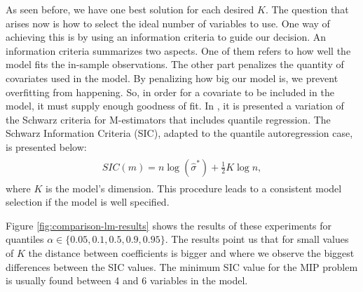 As seen before, we have one best solution for each desired $K$. The question that arises now is how to select the ideal number of variables to use.
One way of achieving this is by using an information criteria to guide our decision. 
An information criteria summarizes two aspects. One of them refers to how well the model fits the in-sample observations. The other part penalizes the quantity of covariates used in the model. By penalizing how big our model is, we prevent overfitting from happening. So, in order for a covariate to be included in the model, it must supply enough goodness of fit.
In \cite{machado1993robust}, it is presented a variation of the Schwarz criteria for M-estimators that includes quantile regression. The Schwarz Information Criteria (SIC), adapted to the quantile autoregression case, is presented below:
\begin{align} 
\begin{split}
SIC(m) = n \log(\hat{\sigma}^*)+\frac{1}{2}K\log n,\label{eq:SIC}
\end{split}					
\end{align}
where $K$ is the model's dimension. This procedure leads to a consistent model selection if the model is well specified. 

Figure \ref{fig:comparison-lm-results} shows the results of these experiments for quantiles $\alpha \in \{0.05, 0.1, 0.5, 0.9, 0.95\}$. The results point us that for small values of $K$ the distance between coefficients is bigger and where we observe the biggest differences between the SIC values. The minimum SIC value for the MIP problem is usually found between 4 and 6 variables in the model.


